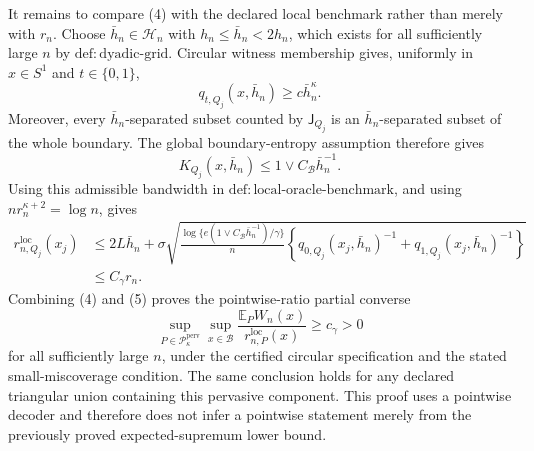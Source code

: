 It remains to compare (4) with the declared local benchmark rather than merely with \(r_n\).  Choose \(\bar h_n\in\mathcal H_n\) with \(h_n\le\bar h_n<2h_n\), which exists for all sufficiently large \(n\) by \(\mathrm{def:dyadic\text{-}grid}\).  Circular witness membership gives, uniformly in \(x\in S^1\) and \(t\in\{0,1\}\),
\[
 q_{t,Q_j}(x,\bar h_n)\ge c\bar h_n^\kappa.
\]
Moreover, every \(\bar h_n\)-separated subset counted by \(\mathsf J_{Q_j}\) is an \(\bar h_n\)-separated subset of the whole boundary.  The global boundary-entropy assumption therefore gives
\[
 K_{Q_j}(x,\bar h_n)
 \le 1\vee C_{\mathcal B}\bar h_n^{-1}.
\]
Using this admissible bandwidth in \(\mathrm{def:local\text{-}oracle\text{-}benchmark}\), and using \(n r_n^{\kappa+2}=\log n\), gives
\[
 \begin{aligned}
 r_{n,Q_j}^{\mathrm{loc}}(x_j)
 &\le 2L\bar h_n+
 \sigma\sqrt{\frac{\log\{e(1\vee C_{\mathcal B}\bar h_n^{-1})/\gamma\}}{n}
 \left\{q_{0,Q_j}(x_j,\bar h_n)^{-1}
       +q_{1,Q_j}(x_j,\bar h_n)^{-1}\right\}}\\
 &\le C_\gamma r_n. \tag{5}
 \end{aligned}
\]
Combining (4) and (5) proves the pointwise-ratio partial converse
\[
 \sup_{P\in\mathcal P_{\kappa}^{\mathrm{perv}}}
 \sup_{x\in\mathcal B}
 \frac{\mathbb E_P W_n(x)}{r_{n,P}^{\mathrm{loc}}(x)}
 \ge c_\gamma>0
\]
for all sufficiently large \(n\), under the certified circular specification and the stated small-miscoverage condition.  The same conclusion holds for any declared triangular union containing this pervasive component.  This proof uses a pointwise decoder and therefore does not infer a pointwise statement merely from the previously proved expected-supremum lower bound.